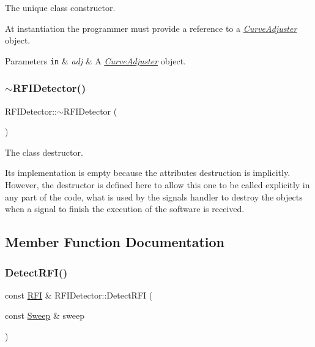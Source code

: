 The unique class constructor. 

At instantiation the programmer must provide a reference to a {\itshape \hyperlink{classCurveAdjuster}{Curve\+Adjuster}} object. 
\begin{DoxyParams}[1]{Parameters}
\mbox{\tt in}  & {\em adj} & A {\itshape \hyperlink{classCurveAdjuster}{Curve\+Adjuster}} object. \\
\hline
\end{DoxyParams}
\mbox{\label{classRFIDetector_a6445cd27f7b22459d8f1e3b67c323cf0}} 
\subsubsection{\texorpdfstring{$\sim$\+R\+F\+I\+Detector()}{~RFIDetector()}}
{\footnotesize\ttfamily R\+F\+I\+Detector\+::$\sim$\+R\+F\+I\+Detector (\begin{DoxyParamCaption}{ }\end{DoxyParamCaption})\hspace{0.3cm}{\ttfamily [inline]}}



The class destructor. 

Its implementation is empty because the attributes destruction is implicitly. However, the destructor is defined here to allow this one to be called explicitly in any part of the code, what is used by the signals handler to destroy the objects when a signal to finish the execution of the software is received. 

\subsection{Member Function Documentation}
\mbox{\label{classRFIDetector_a98bf817b6c6aee954e0f0056fb5e4360}} 
\subsubsection{\texorpdfstring{Detect\+R\+F\+I()}{DetectRFI()}}
{\footnotesize\ttfamily const \hyperlink{structRFI}{R\+FI} \& R\+F\+I\+Detector\+::\+Detect\+R\+FI (\begin{DoxyParamCaption}\item[{const \hyperlink{structSweep}{Sweep} \&}]{sweep }\end{DoxyParamCaption})}



